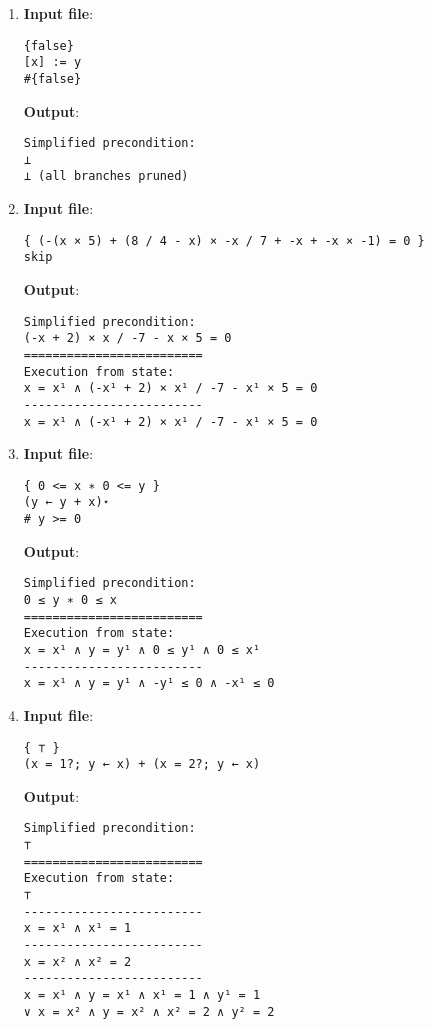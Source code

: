 \documentclass[parskip=half]{scrartcl}
\begin{document}
\begin{enumerate}
\textbf{Output}: 
\begin{verbatim}
Simplified precondition:
x ↦ _
=========================
Execution from state:
x¹ ↦ _ ∧ x = x¹ ∧ ⊤
-------------------------
x = x¹ ∧ x¹ ↦̸
\end{verbatim}

\item 
\textbf{Input file}: 
\begin{verbatim}
{false}
[x] := y   
#{false}
\end{verbatim}

\textbf{Output}: 
\begin{verbatim}
Simplified precondition:
⊥
⊥ (all branches pruned)
\end{verbatim}

\item 
\textbf{Input file}: 
\begin{verbatim}
{ (-(x × 5) + (8 / 4 - x) × -x / 7 + -x + -x × -1) = 0 }
skip
\end{verbatim}

\textbf{Output}: 
\begin{verbatim}
Simplified precondition:
(-x + 2) × x / -7 - x × 5 = 0
=========================
Execution from state:
x = x¹ ∧ (-x¹ + 2) × x¹ / -7 - x¹ × 5 = 0
-------------------------
x = x¹ ∧ (-x¹ + 2) × x¹ / -7 - x¹ × 5 = 0
\end{verbatim}

\item 
\textbf{Input file}: 
\begin{verbatim}
{ 0 <= x ∗ 0 <= y }
(y ← y + x)⋆
# y >= 0
\end{verbatim}

\textbf{Output}: 
\begin{verbatim}
Simplified precondition:
0 ≤ y ∗ 0 ≤ x
=========================
Execution from state:
x = x¹ ∧ y = y¹ ∧ 0 ≤ y¹ ∧ 0 ≤ x¹
-------------------------
x = x¹ ∧ y = y¹ ∧ -y¹ ≤ 0 ∧ -x¹ ≤ 0
\end{verbatim}

\item \textbf{Input file}: 
\begin{verbatim}
{ ⊤ }
(x = 1?; y ← x) + (x = 2?; y ← x)
\end{verbatim}

\textbf{Output}: 
\begin{verbatim}
Simplified precondition:
⊤
=========================
Execution from state:
⊤
-------------------------
x = x¹ ∧ x¹ = 1
-------------------------
x = x² ∧ x² = 2
-------------------------
x = x¹ ∧ y = x¹ ∧ x¹ = 1 ∧ y¹ = 1
∨ x = x² ∧ y = x² ∧ x² = 2 ∧ y² = 2
\end{verbatim}


\end{enumerate}
\end{document}
